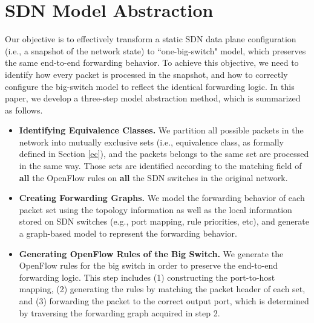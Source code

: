 \section{SDN Model Abstraction}
\label{Sec:Design}

Our objective is to effectively transform a static SDN data plane configuration (i.e., a snapshot of the network state) to ``one-big-switch" model, which preserves the same end-to-end forwarding behavior. %
To achieve this objective, we need to identify how every packet is processed in the snapshot, and how to correctly configure the big-switch model to reflect the identical forwarding logic. In this paper, we develop a three-step model abstraction method, which is summarized as follows.

\begin{itemize}
\item \textbf{Identifying Equivalence Classes.} We partition all possible packets in the network into mutually exclusive sets (i.e., equivalence class, as formally defined in Section \ref{ec}), and the packets belongs to the same set are processed in the same way. Those sets are identified according to the matching field of \textbf{all} the OpenFlow rules on \textbf{all} the SDN switches in the original network.

\item \textbf{Creating Forwarding Graphs.} We model the forwarding behavior of each packet set using the topology information as well as the local information stored on SDN switches (e.g., port mapping, rule priorities, etc), and generate a graph-based model to represent the forwarding behavior.
\item \textbf{Generating OpenFlow Rules of the Big Switch.} We generate the OpenFlow rules for the big switch in order to preserve the end-to-end forwarding logic. This step includes (1) constructing the port-to-host mapping, (2) generating the rules by matching the packet header of each set,  and (3) forwarding the packet to the correct output port, which is determined by traversing the forwarding graph acquired in step 2.
\end{itemize}


